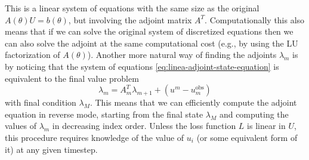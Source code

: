 This is a linear system of equations with the same size as the original $A(\theta) U = b(\theta)$, but involving the adjoint matrix $A^T$. 
Computationally this also means that if we can solve the original system of discretized equations then we can also solve the adjoint at the same computational cost (e.g., by using the LU factorization of $A(\theta)$). 
Another more natural way of finding the adjoints $\lambda_m$ is by noticing that the system of equations \eqref{eq:linea-adjoint-state-equation} is equivalent to the final value problem 
\begin{equation}
    \lambda_{m} = A_{m}^T \lambda_{m+1} + (u^m - u_m^\text{obs})
    \label{eq:adjoint-discrete-linear-example}
\end{equation}
with final condition $\lambda_M$. 
This means that we can efficiently compute the adjoint equation in reverse mode, starting from the final state $\lambda_M$ and computing the values of $\lambda_m$ in decreasing index order. 
Unless the loss function $L$ is linear in $U$, this procedure requires knowledge of the value of $u_i$ (or some equivalent form of it) at any given timestep. 